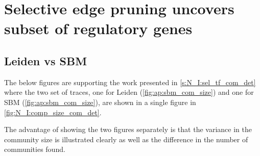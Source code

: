 \chapter{Selective edge pruning uncovers subset of regulatory genes} \label{s:ap:sel_prun}

\section{Leiden vs SBM} \label{s:ap:leiden_sbm}

The below figures are supporting the work presented in \cref{s:N_I:sel_tf_com_det} where the two set of traces, one for Leiden (\cref{fig:ap:sbm_com_size}) and one for SBM (\cref{fig:ap:sbm_com_size}), are shown in a single figure in \cref{fig:N_I:comp_size_com_det}. 

The advantage of showing the two figures separately is that the variance in the community size is illustrated clearly as well as the difference in the number of communities found.

